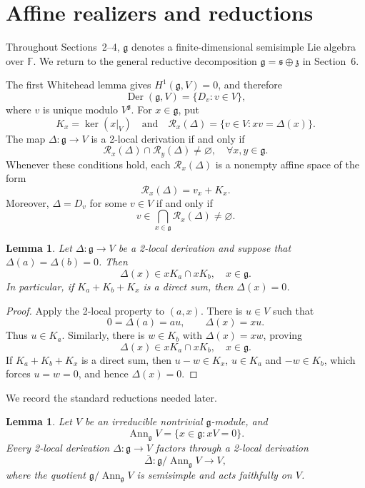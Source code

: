 \documentclass[12pt,reqno]{amsart}
\newtheorem{lemma}[theorem]{Lemma}
\theoremstyle{definition}
\theoremstyle{remark}
\numberwithin{equation}{section}
\newcommand{\F}{\mathbb{F}}
\newcommand{\g}{\mathfrak{g}}
\newcommand{\Der}{\operatorname{Der}}
\begin{document}
\section{Affine realizers and reductions}

Throughout Sections~2--4, $\mathfrak g$ denotes a
finite-dimensional semisimple Lie algebra over $\F$.
We return to the general reductive decomposition
$\mathfrak g=\mathfrak s\oplus\mathfrak z$ in Section~6. 


The first Whitehead lemma gives \(H^1(\g,V)=0\), and therefore
\[
  \Der(\g,V)=\{D_v:v\in V\},
\]
where \(v\) is unique modulo \(V^\g\).
For \(x\in\g\), put
\[
  K_x=\ker(x|_V)
  \quad\text{and}\quad
  \mathcal R_x(\Delta)=\{v\in V:xv=\Delta(x)\}.
\]
The map \(\Delta\colon\g\to V\) is a 2-local
derivation if and only if
\[
  \mathcal R_x(\Delta)\cap\mathcal R_y(\Delta)\ne\varnothing, \quad \forall x,y\in\g.
\]
Whenever these conditions hold, each \(\mathcal R_x(\Delta)\) is a nonempty
affine space of the form
\[
  \mathcal R_x(\Delta)=v_x+K_x.
\]
Moreover, \(\Delta=D_v\) for some \(v\in V\) if and only if
\[
  v\in \bigcap_{x\in\g}\mathcal R_x(\Delta)\ne\varnothing.
\]

\begin{lemma}\label{lem:two-anchor}
Let \(\Delta\colon\g\to V\) be a 2-local derivation and suppose that
\(\Delta(a)=\Delta(b)=0\).  Then
\[
  \Delta(x)\in xK_a\cap xK_b, \quad x\in\g.
\]
In particular, if \(K_a+ K_b+ K_x\) is a direct sum, then \(\Delta(x)=0\).
\end{lemma}

\begin{proof}
Apply the 2-local property to \((a,x)\).  There is \(u\in V\) such that
\[
  0=\Delta(a)=au,
  \qquad
  \Delta(x)=xu.
\]
Thus \(u\in K_a\).  Similarly, there is \(w\in K_b\) with
\(\Delta(x)=xw\), proving 
\[
  \Delta(x)\in xK_a\cap xK_b, \quad x\in\g.
\]
If \(K_a+ K_b+ K_x\) is a direct sum, then \(u-w\in K_x\), \(u\in K_a\) and \(-w\in K_b\),
which forces \(u=w=0\), and hence \(\Delta(x)=0\).
\end{proof}

We record the standard reductions needed later.

\begin{lemma}\label{lem:faithful-quotient}
Let \(V\) be an irreducible nontrivial \(\g\)-module, and
\[
  \operatorname{Ann}_\g V=\{x\in\g:xV=0\}.
\]
Every 2-local derivation \(\Delta\colon\g\to V\) factors through a 2-local
derivation
\[
  \overline\Delta\colon\g/\operatorname{Ann}_\g V\longrightarrow V,
\]
where the quotient \(\g/\operatorname{Ann}_\g V\) is semisimple and acts faithfully on \(V\).
\end{lemma}
\end{document}
